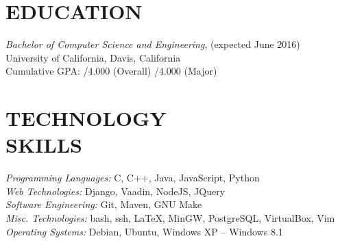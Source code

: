 \documentclass[line, letterpaper, 10pt]{res}
\begin{document}
\address{jmmcgee@ucdavis.edu | (323) 557-8647}

\begin{resume}


\section{EDUCATION}
    {\sl Bachelor of Computer Science and Engineering}, (expected June 2016) \\
    University of California, Davis, California \\
    Cumulative GPA: /4.000 (Overall) /4.000 (Major)

\section{TECHNOLOGY \\ SKILLS} 
    {\sl Programming Languages:}  C, C++, Java, JavaScript, Python \\
    {\sl Web Technologies:} Django, Vaadin, NodeJS, JQuery \\
    {\sl Software Engineering:} Git, Maven, GNU Make \\
    {\sl Misc. Technologies:} bash, ssh, LaTeX, MinGW, PostgreSQL, VirtualBox, Vim \\
    {\sl Operating Systems:} Debian, Ubuntu, Windows XP -- Windows 8.1


\end{resume}
\end{document}
